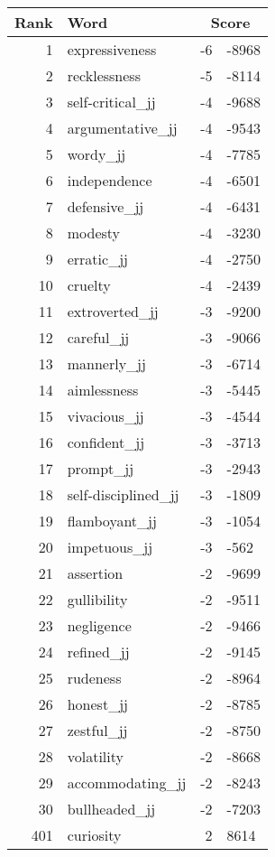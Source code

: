 \begin{longtable}[!htbp]{| rlr@{.}l |}
    \hline
    \textbf{Rank} & \textbf{Word} & \multicolumn{2}{c|}{\textbf{Score}} \\
    \hline
    \endhead
    1 & expressiveness & -6 & -8968 \\
    2 & recklessness & -5 & -8114 \\
    3 & self-critical\_jj & -4 & -9688 \\
    4 & argumentative\_jj & -4 & -9543 \\
    5 & wordy\_jj & -4 & -7785 \\
    6 & independence & -4 & -6501 \\
    7 & defensive\_jj & -4 & -6431 \\
    8 & modesty & -4 & -3230 \\
    9 & erratic\_jj & -4 & -2750 \\
    10 & cruelty & -4 & -2439 \\
    11 & extroverted\_jj & -3 & -9200 \\
    12 & careful\_jj & -3 & -9066 \\
    13 & mannerly\_jj & -3 & -6714 \\
    14 & aimlessness & -3 & -5445 \\
    15 & vivacious\_jj & -3 & -4544 \\
    16 & confident\_jj & -3 & -3713 \\
    17 & prompt\_jj & -3 & -2943 \\
    18 & self-disciplined\_jj & -3 & -1809 \\
    19 & flamboyant\_jj & -3 & -1054 \\
    20 & impetuous\_jj & -3 & -562 \\
    21 & assertion & -2 & -9699 \\
    22 & gullibility & -2 & -9511 \\
    23 & negligence & -2 & -9466 \\
    24 & refined\_jj & -2 & -9145 \\
    25 & rudeness & -2 & -8964 \\
    26 & honest\_jj & -2 & -8785 \\
    27 & zestful\_jj & -2 & -8750 \\
    28 & volatility & -2 & -8668 \\
    29 & accommodating\_jj & -2 & -8243 \\
    30 & bullheaded\_jj & -2 & -7203 \\
    401 & curiosity & 2 & 8614 \\

\end{longtable}
